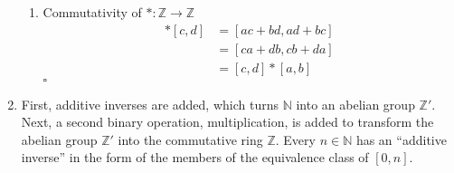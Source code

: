 \documentclass{article}
\newcommand{\N}{\mathbb{N}}
\newcommand{\Z}{\mathbb{Z}}
\begin{document}
\begin{enumerate}[label=\textbf{(\alph*)}]
{\begin{enumerate}[label=(\arabic*)]
{          Associativity of $*:\Z\to\Z$
          \begin{align*}
            ([a,b]*[c,d])*[e,f] &= [ac+bd,ad+bc]*[e,f]                  \\
                                &= [(ac+bd)e+(ad+bc)f,(ac+bd)f+(ad+bc)e]\\
                                &= [ace+bde+adf+bcf,acf+bdf+ade+bce]    \\
                                &= [a(ce+df)+b(cf+de),a(cf+de)+b(df+ce)]\\
                                &= [a,b]*[ce+df,cf+de]                  \\
                                &= [a,b]*([c,d]*[e,f])
          \end{align*}
        }
        \item{
          Commutativity of $*:\Z\to\Z$
          \begin{align*}
            [a,b]*[c,d] &= [ac+bd,ad+bc] \\
                        &= [ca+db,cb+da] \\
                        &= [c,d]*[a,b]
          \end{align*}
        }
        \hfill $\square$
      \end{enumerate}
    }
    \item{
      First, additive inverses are added, which turns $\N$ into an abelian group
      $\Z'$. Next, a second binary operation, multiplication, is added to
      transform the abelian group $\Z'$ into the commutative ring $\Z$. Every
      $n\in\N$ has an ``additive inverse'' in the form of the members of the
      equivalence class of $[0,n]$.
    }
  \end{enumerate}

\vfill
\end{document}
